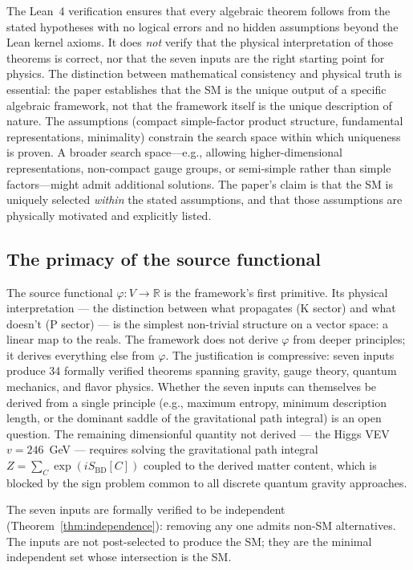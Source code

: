 \documentclass[12pt,a4paper]{article}
\begin{document}
The Lean~4 verification ensures that every algebraic theorem follows from the stated hypotheses with no logical errors and no hidden assumptions beyond the Lean kernel axioms. It does \emph{not} verify that the physical interpretation of those theorems is correct, nor that the seven inputs are the right starting point for physics. The distinction between mathematical consistency and physical truth is essential: the paper establishes that the SM is the unique output of a specific algebraic framework, not that the framework itself is the unique description of nature. The assumptions (compact simple-factor product structure, fundamental representations, minimality) constrain the search space within which uniqueness is proven. A broader search space---e.g., allowing higher-dimensional representations, non-compact gauge groups, or semi-simple rather than simple factors---might admit additional solutions. The paper's claim is that the SM is uniquely selected \emph{within} the stated assumptions, and that those assumptions are physically motivated and explicitly listed.

\subsection{The primacy of the source functional}

The source functional $\varphi : V \to \mathbb{R}$ is the framework's first primitive.  Its physical interpretation --- the distinction between what propagates (K sector) and what doesn't (P sector) --- is the simplest non-trivial structure on a vector space: a linear map to the reals.  The framework does not derive $\varphi$ from deeper principles; it derives everything else from $\varphi$.  The justification is compressive: seven inputs produce 34 formally verified theorems spanning gravity, gauge theory, quantum mechanics, and flavor physics.  Whether the seven inputs can themselves be derived from a single principle (e.g., maximum entropy, minimum description length, or the dominant saddle of the gravitational path integral) is an open question.  The remaining dimensionful quantity not derived --- the Higgs VEV $v = 246$~GeV --- requires solving the gravitational path integral $Z = \sum_C \exp(iS_{\mathrm{BD}}[C])$ coupled to the derived matter content, which is blocked by the sign problem common to all discrete quantum gravity approaches.

The seven inputs are formally verified to be independent (Theorem~\ref{thm:independence}): removing any one admits non-SM alternatives.  The inputs are not post-selected to produce the SM; they are the minimal independent set whose intersection is the SM.
\end{document}
